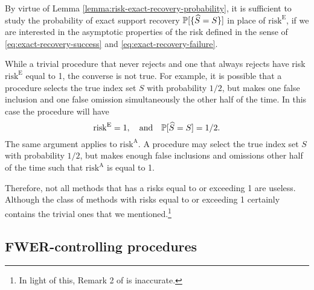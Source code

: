 \begin{remark}
By virtue of Lemma \ref{lemma:risk-exact-recovery-probability}, it is sufficient to study the probability of exact support recovery $\P[\{\widehat{S}=S\}]$ in place of $\mathrm{risk}^{\mathrm{E}}$, if we are interested in the asymptotic properties of the risk defined in the sense of \eqref{eq:exact-recovery-success} and \eqref{eq:exact-recovery-failure}.
\end{remark}

\begin{remark} \label{rmk:asymptotic-risks}
While a trivial procedure that never rejects and one that always rejects have risk $\mathrm{risk}^{\mathrm{E}}$ equal to 1, the converse is not true.
For example, it is possible that a procedure selects the true index set $S$ with probability $1/2$, but makes one false inclusion and one false omission simultaneously the other half of the time. 
In this case the procedure will have 
$$\mathrm{risk}^{\mathrm{E}} = 1, \quad \text{and} \quad \P[\widehat{S}=S] = 1/2.$$
The same argument applies to $\mathrm{risk}^{\mathrm{A}}$. 
A procedure may select the true index set $S$ with probability $1/2$, but makes enough false inclusions and omissions other half of the time such that $\mathrm{risk}^{\mathrm{A}}$ is equal to 1. 

Therefore, not all methods that has a risks equal to or exceeding 1 are useless. 
Although the class of methods with risks equal to or exceeding 1 certainly contains the trivial ones that we mentioned.\footnote{In light of this, Remark 2 of \citet*{arias2017distribution} is inaccurate.}
\end{remark}


\subsection{FWER-controlling procedures}
\label{subsec:FWER-controlling-procedures}

